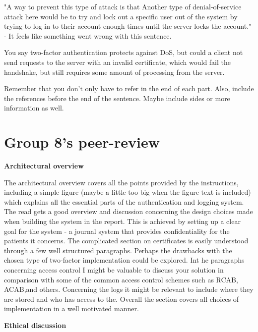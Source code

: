 \documentclass{article}
\begin{document}
"A way to prevent this type of attack is that Another type of denial-of-service attack here would be to try and lock out a specific user out of the system by trying to log in to their account enough times until the server locks the account." - It feels like something went wrong with this sentence.

You say two-factor authentication protects against DoS, but could a client not send requests to the server with an invalid certificate, which would fail the handshake, but still requires some amount of processing from the server.

Remember that you don't only have to refer in the end of each part. Also, include the references before the end of the sentence. Maybe include sides or more information as well.

\newpage

\section*{Group 8’s peer-review}

\textbf{Architectural overview}

The architectural overview covers all the points provided by the instructions, including a simple figure (maybe a little too big when the figure-text is included) which explains all the essential parts of the authentication and logging system. The read gets a good overview and discussion concerning the design choices made when building the system in the report. This is achieved by setting up a clear goal for the system - a journal system that provides confidentiality for the patients it concerns. The complicated section on certificates is easily understood through a few well structured paragraphs. Perhaps the drawbacks with the chosen type of two-factor implementation could be explored. Int he paragraphs concerning access control I might be valuable to discuss your solution in comparison with some of the common access control schemes such as RCAB, ACAB,and others. Concerning the logs it might be relevant to include where they are stored and who has access to the. Overall the section covers all choices of implementation in a well motivated manner.

\textbf{Ethical discussion}
\end{document}
